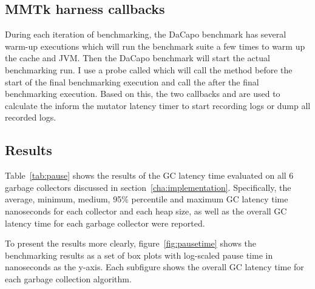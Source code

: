 \subsection{MMTk harness callbacks}

During each iteration of benchmarking, the DaCapo benchmark has several warm-up
executions which will run the benchmark suite a few times to warm up the cache and JVM.
Then the DaCapo benchmark will start the actual benchmarking run. I use a probe called 
which will call the  method
before the start of the final benchmarking execution and call the 
after the final benchmarking execution. Based on this, the two callbacks
 and  are used to calculate the inform the mutator
latency timer to start recording logs or dump all recorded logs.

\subsection{Results}

\begin{table*}
  \centering
  \label{tab:pause}
  
  \caption{Results of the GC pause time}
\end{table*}

\begin{figure*}
  \centering
  \texttt{[image: \{figs/pause-time.png]}}
  \caption{Pause times of 6 collectors}
  \label{fig:pausetime}
\end{figure*}

\begin{table*}
  \centering
  
  \caption{Ratio of full GCs}
  \label{tab:fullgc}
\end{table*}

Table~\ref{tab:pause} shows the results of the GC latency time
evaluated on all 6 garbage collectors discussed in section~\ref{cha:implementation}.
Specifically, the average, minimum, medium, 95\% percentile and maximum GC latency time nanoseconds
for each collector and each heap size,
as well as the overall GC latency time for each garbage collector
were reported.

To present the results more clearly, figure~\ref{fig:pausetime} shows
the benchmarking results as a set of box plots with log-scaled pause time in nanoseconds as the y-axis.
Each subfigure shows the overall GC latency time for each garbage collection algorithm.

